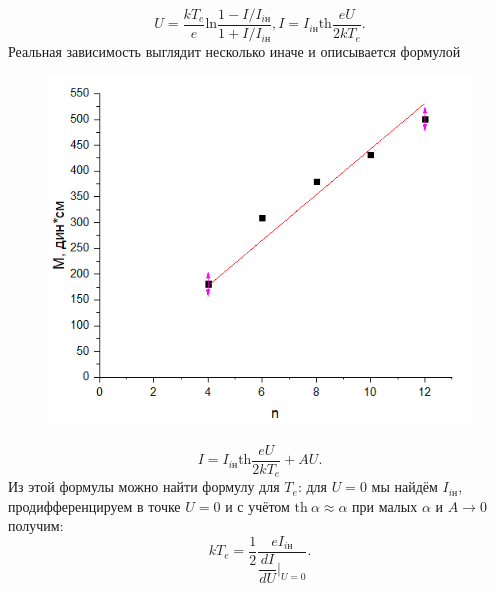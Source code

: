 \documentclass[a4paper,12pt]{article}
\begin{document}
\begin{equation}
U = \dfrac{kT_e}{e}\text{ln}\dfrac{1 - I/I_{i\text{н}}}{1 + I/I_{i\text{н}}}, 
I = I_{i\text{н}} \text{th}\dfrac{eU}{2kT_e}.
\end{equation}
Реальная зависимость выглядит несколько иначе и описывается формулой 
\begin{figure}
\includegraphics[scale=0.8]{4.png}
\vspace{+30pt}
\end{figure}
\begin{equation}
I = I_{i\text{н}} \text{th}\dfrac{eU}{2kT_e} + AU.
\end{equation}
Из этой формулы можно найти формулу для $T_e$: для $U=0$ мы найдём $I_{i\text{н}}$, продифференцируем в точке $U=0$ и с учётом $\text{th}~\alpha \approx \alpha$ при малых $\alpha$ и $A\rightarrow 0$ получим:
\begin{equation}
kT_e = \dfrac{1}{2}\dfrac{eI_{i\text{н}}}{\dfrac{dI}{dU}|_{U=0}}.
\end{equation}
\end{document}
